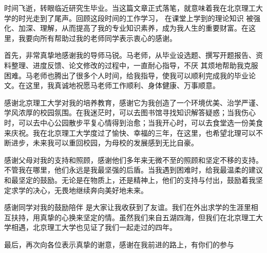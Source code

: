 \begin{acknowledgements}

  时间飞逝，转眼临近研究生毕业。当这篇文章正式落笔，就意味着我在北京理工大学的时光走到了尾声。回顾这段时间的工作学习， 在课堂上学到的理论知识 被强化、加深、理解，从而提高了我的专业知识素养，成为我人生的重要财富。在这里，我要向所有帮助过我的老师同学表示衷心的感谢。
  
  首先，非常真挚地感谢我的导师马锐。马老师，从毕业设选题、撰写开题报告、资料整理、进度反馈、论文修改的过程中，一直耐心指导，不厌  其烦地帮助我克服困难。马老师也腾出了很多个人时间，给我指导，使我可以顺利完成我的毕业论文。在这里，我真诚地祝愿马老师工作顺利、身体健康、万事顺意。

  感谢北京理工大学对我的培养教育，感谢它为我创造了一个环境优美、治学严谨、学风浓厚的校园氛围。在我迷茫时，可以去图书馆寻找知识解答疑惑；当我伤心时，可以去中心公园散步平复心情得到治愈；当我开心时，可以去食堂选一份美食来庆祝。我在北京理工大学度过了愉快、幸福的三年，在这里，也希望北理可以不断进步，未来我可以重回校园，为母校的发展感到无比自豪。

  感谢父母对我的支持和照顾，感谢他们多年来无微不至的照顾和坚定不移的支持。不管我在哪里，他们永远是我最坚强的后盾。当我遇到困难时，给我最温柔的建议和最坚定的鼓励。无论是在物质上，还是精神上，他们的支持与付出，鼓励着我坚定求学的决心，无畏地继续奔向美好地未来。
  
  感谢同学对我的鼓励陪伴 是大家让我收获到了友谊。我们在外出求学的生涯里相互扶持，用真挚的心换来坚定的情。虽然我们来自五湖四海，但我们在北京理工大学相遇，北京理工大学也见证了我们一起走过的四年。

  最后，再次向各位表示真挚的谢意，感谢在我前进的路上，有你们的参与
\end{acknowledgements}
